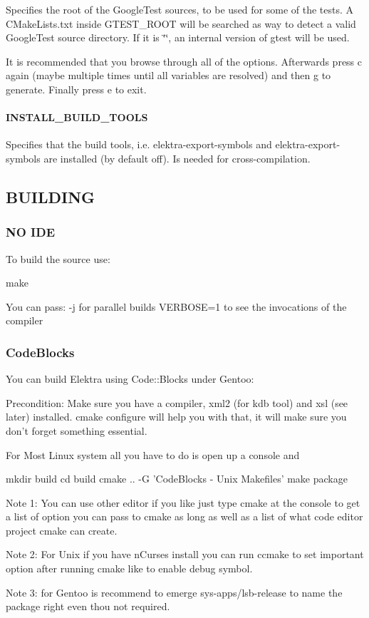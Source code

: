 Specifies the root of the Google\+Test sources, to be used for some of the tests. A C\+Make\+Lists.\+txt inside G\+T\+E\+S\+T\+\_\+\+R\+O\+O\+T will be searched as way to detect a valid Google\+Test source directory. If it is \char`\"{}\char`\"{}, an internal version of gtest will be used.

It is recommended that you browse through all of the options. Afterwards press c again (maybe multiple times until all variables are resolved) and then g to generate. Finally press e to exit.

\paragraph*{I\+N\+S\+T\+A\+L\+L\+\_\+\+B\+U\+I\+L\+D\+\_\+\+T\+O\+O\+L\+S}

Specifies that the build tools, i.\+e. {\ttfamily elektra-\/export-\/symbols} and {\ttfamily elektra-\/export-\/symbols} are installed (by default off). Is needed for cross-\/compilation.

\subsection*{B\+U\+I\+L\+D\+I\+N\+G}

\subsubsection*{N\+O I\+D\+E}

To build the source use\+: \begin{DoxyVerb}make
\end{DoxyVerb}


You can pass\+: -\/j for parallel builds V\+E\+R\+B\+O\+S\+E=1 to see the invocations of the compiler

\subsubsection*{Code\+Blocks}

You can build Elektra using Code\+::\+Blocks under Gentoo\+:

Precondition\+: Make sure you have a compiler, xml2 (for kdb tool) and xsl (see later) installed. cmake configure will help you with that, it will make sure you don't forget something essential.

For Most Linux system all you have to do is open up a console and \begin{DoxyVerb}    mkdir build
    cd build
    cmake .. -G 'CodeBlocks - Unix Makefiles'
    make package
\end{DoxyVerb}


Note 1\+: You can use other editor if you like just type cmake at the console to get a list of option you can pass to cmake as long as well as a list of what code editor project cmake can create.

Note 2\+: For Unix if you have n\+Curses install you can run ccmake to set important option after running cmake like to enable debug symbol.

Note 3\+: for Gentoo is recommend to emerge sys-\/apps/lsb-\/release to name the package right even thou not required. 